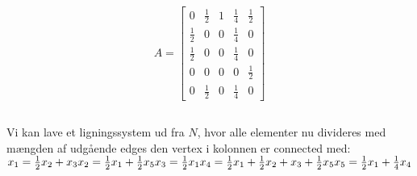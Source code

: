 \documentclass[a4paper,12pt]{article}
\begin{document}
\[
A =
\left[\begin{array}{ccccc}
    0 & \frac{1}{2} & 1 & \frac{1}{4} & \frac{1}{2} \\
    \frac{1}{2} & 0 & 0 & \frac{1}{4} & 0 \\
    \frac{1}{2} & 0 & 0 & \frac{1}{4} & 0 \\
    0 & 0 & 0 & 0 & \frac{1}{2} \\
    0 & \frac{1}{2} & 0 & \frac{1}{4} & 0
\end{array}\right]
\]

\subsection{}
Vi kan lave et ligningssystem ud fra $N$, hvor alle elementer nu divideres med mængden af udgående edges den vertex i kolonnen er connected med:\\

$
x_1= \frac{1}{2}x_2 + x_3 \\
x_2= \frac{1}{2}x_1 + \frac{1}{2}x_5 \\
x_3= \frac{1}{2}x_1 \\
x_4= \frac{1}{2}x_1 + \frac{1}{2}x_2 + x_3 + \frac{1}{2}x_5 \\
x_5= \frac{1}{2}x_1 + \frac{1}{4}x_4
$\\
\end{document}
